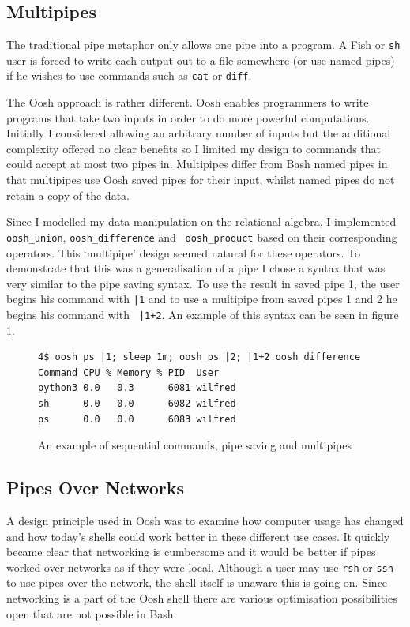 \documentclass[12pt,twoside,notitlepage]{report}
\begin{document}
\subsection{Multipipes}

The traditional pipe metaphor only allows one pipe into a program. A
Fish or {\tt sh} user is forced to write each output out to a file
somewhere (or use named pipes) if he wishes to use commands such as
{\tt cat} or {\tt diff}.

The Oosh approach is rather different. Oosh enables programmers to
write programs that take two inputs in order to do more powerful
computations. Initially I considered allowing an arbitrary number of
inputs but the additional complexity offered no clear benefits so I
limited my design to commands that could accept at most two pipes
in. Multipipes differ from Bash named pipes in that multipipes use
Oosh saved pipes for their input, whilst named pipes do not retain a
copy of the data.

Since I modelled my data manipulation on the relational algebra, I
implemented {\tt oosh\_union}, {\tt oosh\_difference} and {\tt
  oosh\_product} based on their corresponding operators. This
`multipipe' design seemed natural for these operators. To demonstrate
that this was a generalisation of a pipe I chose a syntax that was
very similar to the pipe saving syntax. To use the result in saved
pipe 1, the user begins his command with {\tt |1} and to use a
multipipe from saved pipes 1 and 2 he begins his command with {\tt
  |1+2}. An example of this syntax can be seen in figure \ref{multipipe}.

\begin{figure}[h]
\begin{Verbatim}[frame=single,framerule=0.2pt,framesep=5pt]
4$ oosh_ps |1; sleep 1m; oosh_ps |2; |1+2 oosh_difference
Command CPU % Memory % PID  User
python3 0.0   0.3      6081 wilfred
sh      0.0   0.0      6082 wilfred
ps      0.0   0.0      6083 wilfred
\end{Verbatim}
\caption{An example of sequential commands, pipe saving and
  multipipes}
\label{multipipe}
\end{figure}

\subsection{Pipes Over Networks}

A design principle used in Oosh was to examine how computer usage has
changed and how today's shells could work better in these different
use cases. It quickly became clear that networking is cumbersome and
it would be better if pipes worked over networks as if they were
local. Although a user may use {\tt rsh} or {\tt ssh} to use pipes
over the network, the shell itself is unaware this is going on. Since
networking is a part of the Oosh shell there are various optimisation
possibilities open that are not possible in Bash.
\end{document}
